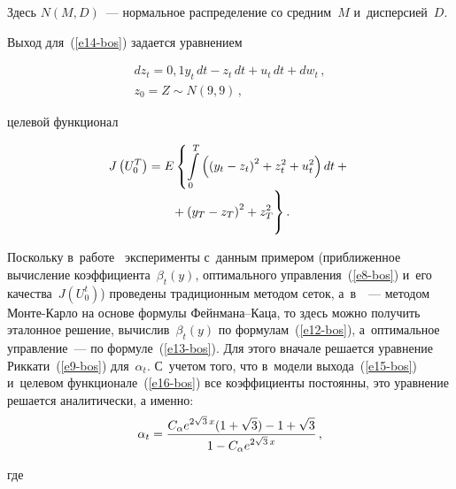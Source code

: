 \begin{multicols}{2}
     \vspace*{-3pt}
     
     \noindent
Здесь $N(M,D)$~--- нормальное распределение со средним~$M$ и~дисперсией~$D$.
     
     Выход для~(\ref{e14-bos}) задается уравнением
     
     \vspace*{-3pt}
     
     \noindent
     \begin{multline}
     dz_t=0{,}1 y_t\,dt-z_t\,dt+u_t\,dt+dw_t\,,\\
      z_0=Z\sim N(9{,}9)\,,
     \label{e15-bos}
\end{multline}

\vspace*{-3pt}

\noindent
целевой функционал

\vspace*{-3pt}

\noindent
\begin{multline}
J\left(U_0^{{T}}\right) =E\left\{ \int\limits_0^{{T}} \left( \left( y_t-z_t\right)^2 +z_t^2 
+u_t^2\right)dt+{}\right.\\[-4pt]
\left.{}+\left( y_T - z_T\right)^2 +z_T^2
\vphantom{\int\limits_0^{{T}}}
\right\}.
\label{e16-bos}
\end{multline}

\vspace*{-3pt}
     
     Поскольку в~работе~\cite{2-bos} эксперименты с~данным примером 
(приближенное вычисление коэффициента~$\beta_t(y)$, оптимального 
управления~(\ref{e8-bos}) и~его качества~$J(U_0^t)$) проведены 
традиционным методом сеток, а~в~\cite{4-bos}~--- методом Мон\-те-Кар\-ло 
на основе формулы Фейн\-ма\-на--Ка\-ца, то здесь можно получить эталонное 
решение, вычислив~$\beta_t(y)$ по формулам~(\ref{e12-bos}), а~оптимальное 
управление~--- по формуле~(\ref{e13-bos}). Для этого вначале решается уравнение 
Риккати~(\ref{e9-bos}) для~$\alpha_t$. С~учетом того, что в~модели 
выхода~(\ref{e15-bos}) и~целевом функционале~(\ref{e16-bos}) все 
коэффициенты постоянны, это уравнение решается аналитически, а именно:
     \begin{equation*}
     \alpha_t= \displaystyle\frac{\displaystyle C_\alpha e^{2\sqrt{3}\,x}(1+\sqrt{3})-1+\sqrt{3}\mathstrut}{\displaystyle 1-
C_\alpha e^{2\sqrt{3}\,x}\mathstrut}\,,
\end{equation*}

\noindent
где

\vspace*{-3pt}


\end{multicols}
